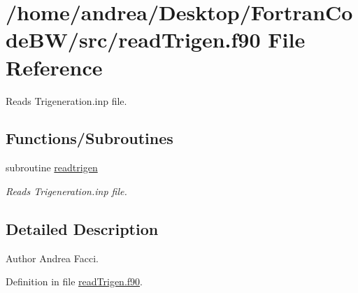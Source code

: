 \hypertarget{read_trigen_8f90}{\section{/home/andrea/\-Desktop/\-Fortran\-Code\-B\-W/src/read\-Trigen.f90 File Reference}
\label{read_trigen_8f90}
}


Reads Trigeneration.\-inp file.  


\subsection*{Functions/\-Subroutines}
\begin{DoxyCompactItemize}
\item 
subroutine \hyperlink{read_trigen_8f90_a2048dd756a11560009d65015dc03f317}{readtrigen}
\begin{DoxyCompactList}\small\item\em Reads Trigeneration.\-inp file. \end{DoxyCompactList}\end{DoxyCompactItemize}


\subsection{Detailed Description}
\begin{DoxyAuthor}{Author}
Andrea Facci. 
\end{DoxyAuthor}


Definition in file \hyperlink{read_trigen_8f90_source}{read\-Trigen.\-f90}.



